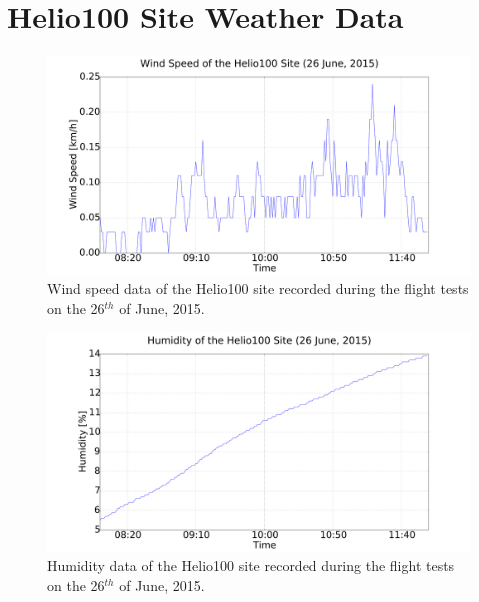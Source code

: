 \chapter{Helio100 Site Weather Data}

\begin{figure}
  \centering
  \includegraphics[width=\textwidth, clip, trim = 90 0 160 0]{figures/appendices/wind_speed}
  \caption[Wind speed data taken during the flight tests.]{Wind speed data of the Helio100 site recorded during the flight tests on the 26$^{th}$ of June, 2015.}
\end{figure}

\begin{figure}
  \centering
  \includegraphics[width=\textwidth, clip, trim = 90 0 160 0]{figures/appendices/humidity}
  \caption[Humidity data taken during the flight test.]{Humidity data of the Helio100 site recorded during the flight tests on the 26$^{th}$ of June, 2015.}
\end{figure}

\endinput
